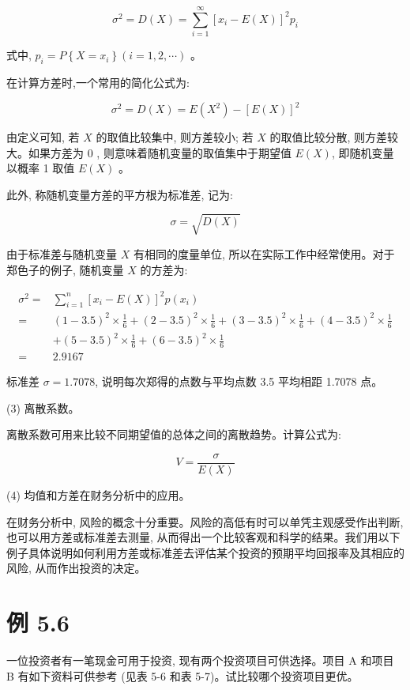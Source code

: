 \documentclass[10pt]{article}
\begin{document}
\begin{CJK*}{UTF8}{bsmi}
\begin{equation*}
\sigma^{2}=D(X)=\sum_{i=1}^{\infty}\left[x_{i}-E(X)\right]^{2} p_{i} \tag{5.5}
\end{equation*}


式中, $p_{i}=P\left\{X=x_{i}\right\}(i=1,2, \cdots)$ 。

在计算方差时,一个常用的简化公式为:


\begin{equation*}
\sigma^{2}=D(X)=E\left(X^{2}\right)-[E(X)]^{2} \tag{5.6}
\end{equation*}


由定义可知, 若 $X$ 的取值比较集中, 则方差较小; 若 $X$ 的取值比较分散, 则方差较大。如果方差为 0 , 则意味着随机变量的取值集中于期望值 $E(X)$, 即随机变量以概率 1 取值 $E(X)$ 。

此外, 称随机变量方差的平方根为标准差, 记为:


\begin{equation*}
\sigma=\sqrt{D(X)} \tag{5.7}
\end{equation*}


由于标准差与随机变量 $X$ 有相同的度量单位, 所以在实际工作中经常使用。对于郑色子的例子, 随机变量 $X$ 的方差为:

$$
\begin{aligned}
\sigma^{2}= & \sum_{i=1}^{n}\left[x_{i}-E(X)\right]^{2} p\left(x_{i}\right) \\
= & (1-3.5)^{2} \times \frac{1}{6}+(2-3.5)^{2} \times \frac{1}{6}+(3-3.5)^{2} \times \frac{1}{6}+(4-3.5)^{2} \times \frac{1}{6} \\
& +(5-3.5)^{2} \times \frac{1}{6}+(6-3.5)^{2} \times \frac{1}{6} \\
= & 2.9167
\end{aligned}
$$

标准差 $\sigma=1.7078$, 说明每次郑得的点数与平均点数 3.5 平均相距 1.7078 点。

(3) 离散系数。

离散系数可用来比较不同期望值的总体之间的离散趋势。计算公式为:

$$
V=\frac{\sigma}{E(X)}
$$

(4) 均值和方差在财务分析中的应用。

在财务分析中, 风险的概念十分重要。风险的高低有时可以单凭主观感受作出判断,也可以用方差或标准差去测量, 从而得出一个比较客观和科学的结果。我们用以下例子具体说明如何利用方差或标准差去评估某个投资的预期平均回报率及其相应的风险, 从而作出投资的决定。

\section*{例 5.6}
一位投资者有一笔现金可用于投资, 现有两个投资项目可供选择。项目 A 和项目 B 有如下资料可供参考 (见表 5-6 和表 5-7)。试比较哪个投资项目更优。


\end{CJK*}
\end{document}
